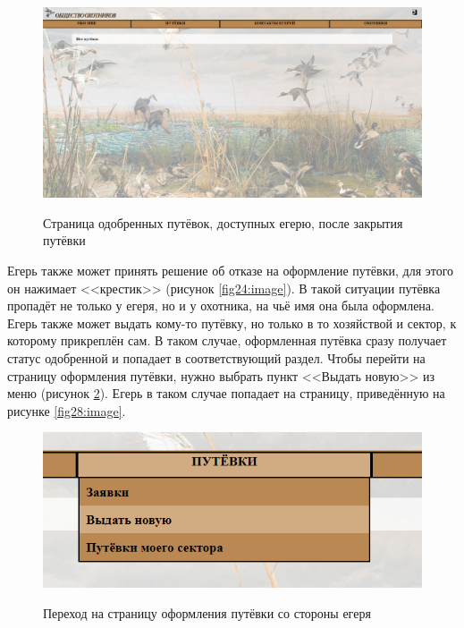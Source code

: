 	\begin{figure}[pt!]
		\centering
		\begin{center}
			{\includegraphics[scale=0.34]{schemes/screens/vouchers_huntsman_del.png}}
			\caption{Страница одобренных путёвок, доступных егерю, после закрытия путёвки}
			\label{fig26:image}
		\end{center}
	\end{figure} 
	\newpage
	
	Егерь также может принять решение об отказе на оформление путёвки, для этого он нажимает <<крестик>> (рисунок \ref{fig24:image}). В такой ситуации путёвка пропадёт не только у егеря, но и у охотника, на чьё имя она была оформлена.\\

	Егерь также может выдать кому-то путёвку, но только в то хозяйствой и сектор, к которому прикреплён сам. В таком случае, оформленная путёвка сразу получает статус одобренной и попадает в соответствующий раздел. Чтобы перейти на страницу оформления путёвки, нужно выбрать пункт <<Выдать новую>> из меню (рисунок \ref{fig27:image}). Егерь в таком случае попадает на страницу, приведённую на рисунке \ref{fig28:image}.
	
	\begin{figure}[h]
		\centering
		\begin{center}
			{\includegraphics[scale=0.5]{schemes/screens/new_huntsman.png}}
			\caption{Переход на страницу оформления путёвки со стороны егеря}
			\label{fig27:image}
		\end{center}
	\end{figure} 

